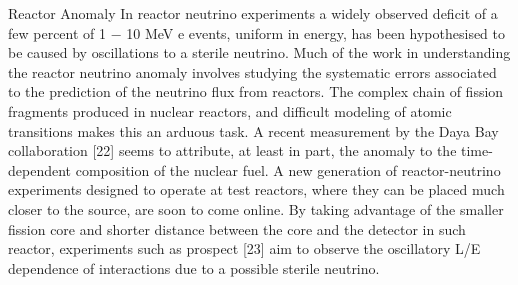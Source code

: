 Reactor Anomaly In reactor neutrino experiments a widely observed deficit of a few percent of 1 − 10 MeV e events, uniform in energy, has been hypothesised to be caused by oscillations to a sterile neutrino. Much of the work in understanding the reactor neutrino anomaly involves studying the systematic errors associated to the prediction of the neutrino flux from reactors. The complex chain of fission fragments produced in nuclear reactors, and difficult modeling of atomic transitions makes this an arduous task. A recent measurement by the Daya Bay collaboration [22] seems to attribute, at least in part, the anomaly to the time-dependent composition of the nuclear fuel. A new generation of reactor-neutrino experiments designed to operate at test reactors, where they can be placed much closer to the source, are soon to come online. By taking advantage of the smaller fission core and shorter distance between the core and the detector in such reactor, experiments such as prospect [23] aim to observe the oscillatory L/E dependence of interactions due to a possible sterile neutrino.